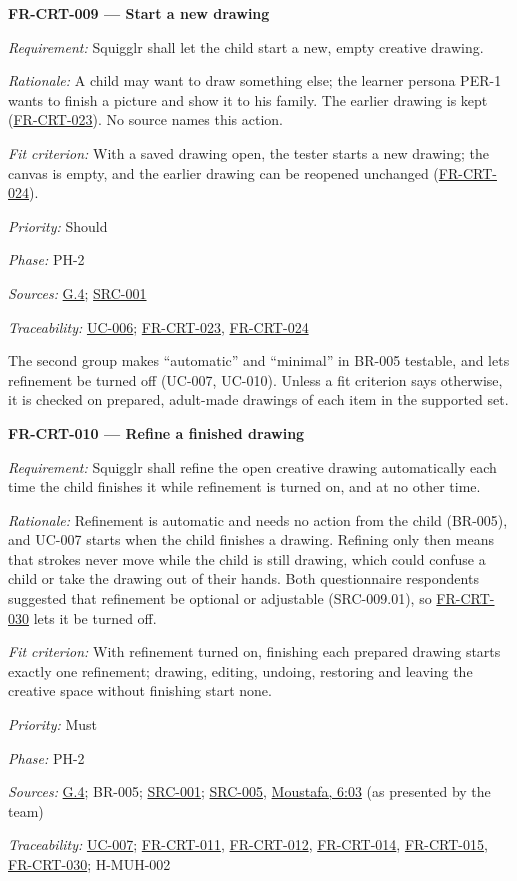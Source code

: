 \documentclass[12pt]{article}
\renewcommand{\_}{\textunderscore\allowbreak}%
\newcommand{\intlink}[3]{\hyperref[int:#1-#2]{#3}}
\newcommand{\intref}[2]{\intlink{#1}{#2}{#1, #2}}
\newcommand{\goalref}[1]{\hyperref[goal:#1]{G.#1}}
\newcommand{\ucref}[1]{\hyperref[uc:#1]{\mbox{UC-#1}}}
\newenvironment{srsrequirement}[2]{%
  \par\medskip\noindent\phantomsection\label{req:#1}%
  \textbf{#1 --- #2}\par\nobreak\smallskip }{\par\medskip}
\newcommand{\reqfield}[2]{\noindent\textit{#1:} #2\par}
\newcommand{\reqshall}[1]{\reqfield{Requirement}{#1}}
\newcommand{\reqrationale}[1]{\reqfield{Rationale}{#1}}
\newcommand{\reqfit}[1]{\reqfield{Fit criterion}{#1}}
\newcommand{\reqpriority}[1]{\reqfield{Priority}{#1}}
\newcommand{\reqphase}[1]{\reqfield{Phase}{#1}}
\newcommand{\reqsources}[1]{\reqfield{Sources}{#1}}
\newcommand{\reqtraces}[1]{\reqfield{Traceability}{#1}}
\newcommand{\reqref}[1]{\hyperref[req:#1]{#1}}
\newcommand{\srcref}[1]{\hyperref[src:#1]{SRC-#1}}
\providecommand{\ucref}[1]{\hyperref[uc:#1]{UC-#1}}
\begin{document}
\begin{srsrequirement}{FR-CRT-009}{Start a new drawing}
  \reqshall{Squigglr shall let the child start a new, empty creative drawing.}
  \reqrationale{A child may want to draw something else; the learner persona
PER-1 wants to finish a picture and show it to his family. The earlier drawing
is kept (\reqref{FR-CRT-023}). No source names this action.} \reqfit{With a
saved drawing open, the tester starts a new drawing; the canvas is empty, and
the earlier drawing can be reopened unchanged (\reqref{FR-CRT-024}).}
  \reqpriority{Should}
  \reqphase{PH-2}
  \reqsources{\goalref{4}; \srcref{001}} \reqtraces{\ucref{006};
  \reqref{FR-CRT-023}, \reqref{FR-CRT-024}}
\end{srsrequirement}

The second group makes ``automatic'' and ``minimal'' in BR-005 testable, and
lets refinement be turned off (UC-007, UC-010). Unless a fit criterion says
otherwise, it is checked on prepared, adult-made drawings of each item in the
supported set.

\begin{srsrequirement}{FR-CRT-010}{Refine a finished drawing}
  \reqshall{Squigglr shall refine the open creative drawing automatically each
time the child finishes it while refinement is turned on, and at no other time.}
\reqrationale{Refinement is automatic and needs no action from the child
(BR-005), and UC-007 starts when the child finishes a drawing. Refining only
then means that strokes never move while the child is still drawing, which could
confuse a child or take the drawing out of their hands. Both questionnaire
respondents suggested that refinement be optional or adjustable (SRC-009.01), so
\reqref{FR-CRT-030} lets it be turned off.} \reqfit{With refinement turned on,
finishing each prepared drawing starts exactly one refinement; drawing, editing,
undoing, restoring and leaving the creative space without finishing start none.}
  \reqpriority{Must}
  \reqphase{PH-2}
  \reqsources{\goalref{4}; BR-005; \srcref{001}; \srcref{005},
\intref{Moustafa}{6:03} (as presented by the team)} \reqtraces{\ucref{007};
\reqref{FR-CRT-011}, \reqref{FR-CRT-012}, \reqref{FR-CRT-014},
\reqref{FR-CRT-015}, \reqref{FR-CRT-030}; H-MUH-002}
\end{srsrequirement}
\end{document}
